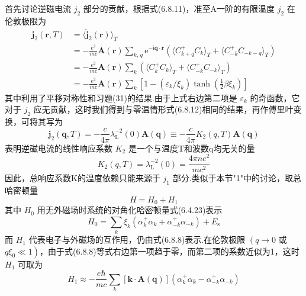 首先讨论逆磁电流 $j_{2}$ 部分的贡献，根据式(6.8.11)，准至A一阶的有限温度 $j_{2}$ 在伦敦极限为
\begin{equation*}
\begin{aligned}
  \boldsymbol{j}_{2}(\boldsymbol{r},T)
  &=\langle\hat{\boldsymbol{j}}_{2}(\boldsymbol{r})\rangle_{T}\\
  &=-\frac{e^{2}}{mc}\boldsymbol{A}(\boldsymbol{r})
  \sum_{k,\,q}\mathrm{e}^{-\mathrm{i}\boldsymbol{q}\cdot\boldsymbol{r}}
  \left(\langle C^{+}_{k+q}C_{k}\rangle_{T}
  +\langle C^{+}_{-k}C_{-k-q}\rangle_{T}\right)\\
  &=-\frac{e^{2}}{mc}\boldsymbol{A}(\boldsymbol{r})
  \sum_{k}\left(\langle C^{+}_{k}C_{k}\rangle_{T}
  +\langle C^{+}_{-k}C_{-k}\rangle_{T}\right)\\
  &=-\frac{e^{2}}{mc}\boldsymbol{A}(\boldsymbol{r})\sum_{k}
  \left[1-\left(\varepsilon_{k}/\xi_{k}\right)
  \tanh\left(\frac{1}{2}\beta\xi_{k}\right)\right]
\end{aligned}
\end{equation*}
其中利用了平移对称性和习题(31)的结果.由于上式右边第二项是 $\varepsilon_{k}$ 的奇函数，它对于 $j_{2}$ 应无贡献，这时我们得到与零温情形式(6.8.12)相同的结果，再作傅里叶变换，可将其写为
\begin{equation*}
  \boldsymbol{j}_{2}(\boldsymbol{q},T)
  =-\frac{c}{4\pi}\lambda_{\mathrm{L}}^{-2}(0)\boldsymbol{A}(\boldsymbol{q})
  \equiv-\frac{c}{4\pi}K_{2}(q,T)\boldsymbol{A}(\boldsymbol{q})
\end{equation*}
表明逆磁电流的线性响应系数 $K_{2}$ 是一个与温度T和波数q均无关的量
\begin{equation}
  K_{2}(q,T)=\lambda_{\mathrm{L}}^{-2}(0)=\frac{4\pi ne^{2}}{mc^{2}}
\end{equation}
因此，总响应系数K的温度依赖只能来源于 $j_{1}$ 部分.类似于本节"1"中的讨论，取总哈密顿量
\begin{equation*}
  H=H_{0}+H_{1}
\end{equation*}
其中 $H_{0}$ 用无外磁场时系统的对角化哈密顿量式(6.4.23)表示
\begin{equation*}
  H_{0}=\sum_{k}\xi_{k}\left(\alpha^{+}_{k}\alpha_{k}
  +\alpha^{+}_{-k}\alpha_{-k}\right)+E_{\mathrm{s}}
\end{equation*}
而 $H_{1}$ 代表电子与外磁场的互作用，仍由式(6.8.8)表示.在伦敦极限 $\left(q\to0\right.$ 或 $\left.q\xi_{0}\ll1\right)$，由于式(6.8.8)等式右边第一项趋于零，而第二项的系数近似为1，这时 $H_{1}$ 可取为
\begin{equation}
  H_{1}\approx-\frac{e\hbar}{mc}\sum_{k}
  \left[\boldsymbol{k}\cdot\boldsymbol{A}(\boldsymbol{q})\right]
  \left(\alpha^{+}_{k}\alpha_{k}-\alpha^{+}_{-k}\alpha_{-k}\right)
\end{equation}
